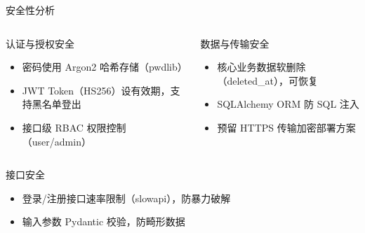 \documentclass[aspectratio=169,UTF8]{ctexbeamer}
\begin{document}
\begin{frame}{安全性分析}
    \begin{columns}
        \begin{block}{认证与授权安全}
            \begin{itemize}
                \item 密码使用 Argon2 哈希存储（pwdlib）
                \item JWT Token（HS256）设有效期，支持黑名单登出
                \item 接口级 RBAC 权限控制（user/admin）
            \end{itemize}
        \end{block}
        \begin{block}{数据与传输安全}
            \begin{itemize}
                \item 核心业务数据软删除（deleted\_at），可恢复
                \item SQLAlchemy ORM 防 SQL 注入
                \item 预留 HTTPS 传输加密部署方案
            \end{itemize}
        \end{block}
    \end{columns}
    \vspace{0.3cm}
    \begin{columns}
        \begin{block}{接口安全}
            \begin{itemize}
                \item 登录/注册接口速率限制（slowapi），防暴力破解
                \item 输入参数 Pydantic 校验，防畸形数据
            \end{itemize}
        \end{block}
    \end{columns}
\end{frame}
\end{document}
